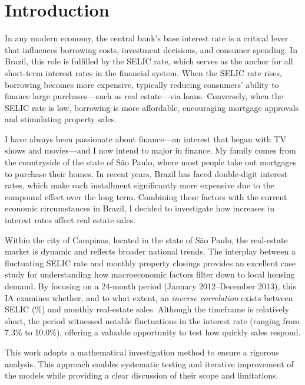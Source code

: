 \documentclass[10pt]{article}
\begin{document}


\section{Introduction}
\label{sec:intro}



In any modern economy, the central bank’s base interest rate is a critical lever that influences borrowing costs, investment decisions, and consumer spending. In Brazil, this role is fulfilled by the SELIC rate, which serves as the anchor for all short-term interest rates in the financial system. When the SELIC rate rises, borrowing becomes more expensive, typically reducing consumers’ ability to finance large purchases—such as real estate—via loans. Conversely, when the SELIC rate is low, borrowing is more affordable, encouraging mortgage approvals and stimulating property sales.

I have always been passionate about finance—an interest that began with TV shows and movies—and I now intend to major in finance. My family comes from the countryside of the state of São Paulo, where most people take out mortgages to purchase their homes. In recent years, Brazil has faced double-digit interest rates, which make each installment significantly more expensive due to the compound effect over the long term. Combining these factors with the current economic circumstances in Brazil, I decided to investigate how increases in interest rates affect real estate sales.

Within the city of Campinas, located in the state of São Paulo, the real-estate market is dynamic and reflects broader national trends. The interplay between a fluctuating SELIC rate and monthly property closings provides an excellent case study for understanding how macroeconomic factors filter down to local housing demand. By focusing on a 24-month period (January 2012–December 2013), this IA examines whether, and to what extent, an \emph{inverse correlation} exists between SELIC (\%) and monthly real-estate sales. Although the timeframe is relatively short, the period witnessed notable fluctuations in the interest rate (ranging from 7.3\% to 10.0\%), offering a valuable opportunity to test how quickly sales respond.

This work adopts a mathematical investigation method to ensure a rigorous analysis. This approach enables systematic testing and iterative improvement of the models while providing a clear discussion of their scope and limitations.
\end{document}
